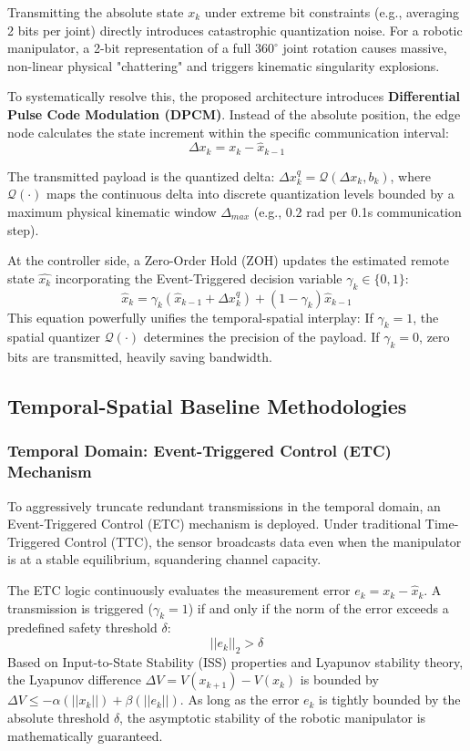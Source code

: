 Transmitting the absolute state $x_k$ under extreme bit constraints (e.g., averaging 2 bits per joint) directly introduces catastrophic quantization noise. 
For a robotic manipulator, a 2-bit representation of a full $360^\circ$ joint rotation causes massive, non-linear physical "chattering" and triggers kinematic singularity explosions.

To systematically resolve this, the proposed architecture introduces \textbf{Differential Pulse Code Modulation (DPCM)}. Instead of the absolute 
position, the edge node calculates the state increment within the specific communication interval:
\begin{equation}
    \Delta x_k = x_k - \hat{x}_{k-1}
\end{equation}

The transmitted payload is the quantized delta: $\Delta x_k^q = \mathcal{Q}(\Delta x_k, b_k)$, where $\mathcal{Q}(\cdot)$ maps the continuous delta into discrete quantization levels bounded by a maximum physical kinematic window $\Delta_{max}$ (e.g., $0.2$ rad per 0.1s communication step).

At the controller side, a Zero-Order Hold (ZOH) updates the estimated remote state $\hat{x_k}$ incorporating the Event-Triggered decision variable 
$\gamma_k\in\{0,1\}$:
\begin{equation}
    \hat{x}_k = \gamma_k (\hat{x}_{k-1} + \Delta x_k^q) + (1 - \gamma_k) \hat{x}_{k-1}
\end{equation}
This equation powerfully unifies the temporal-spatial interplay: If $\gamma_k=1$, the spatial quantizer $\mathcal{Q}(\cdot)$ determines the precision of the payload. 
If $\gamma_k=0$, zero bits are transmitted, heavily saving bandwidth.
\subsection{Temporal-Spatial Baseline Methodologies}
\subsubsection{Temporal Domain: Event-Triggered Control (ETC) Mechanism}
To aggressively truncate redundant transmissions in the temporal domain, an Event-Triggered Control (ETC) mechanism is deployed. 
Under traditional Time-Triggered Control (TTC), the sensor broadcasts data even when the manipulator is at a stable equilibrium, squandering channel capacity.

The ETC logic continuously evaluates the measurement error $e_k = x_k - \hat{x}_k$. 
A transmission is triggered ($\gamma_k = 1$) if and only if the norm of the error exceeds a predefined safety threshold $\delta$:
\begin{equation}
    ||e_k||_2 > \delta
\end{equation}
Based on Input-to-State Stability (ISS) properties and Lyapunov stability theory, the Lyapunov difference $\Delta V = V(x_{k+1}) - V(x_k)$ is bounded by $\Delta V \le -\alpha(||x_k||) + \beta(||e_k||)$. 
As long as the error $e_k$ is tightly bounded by the absolute threshold $\delta$, the asymptotic stability of the robotic manipulator is mathematically guaranteed.
